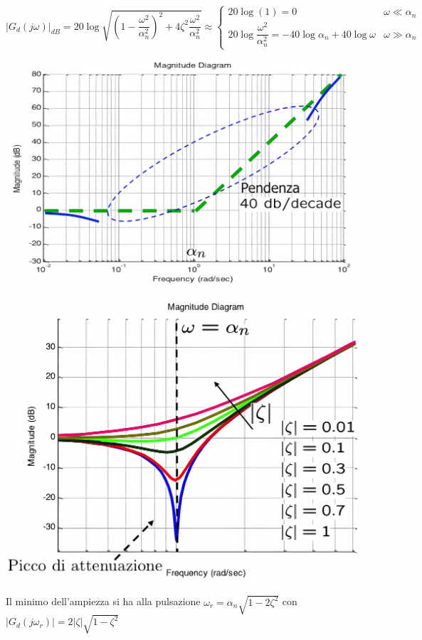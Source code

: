 \documentclass{article}
\numberwithin{equation}{subsection}
\begin{document}
\begin{equation*}
    |G_d(j\omega)|_{dB} = 20 \log \sqrt{\left(1 - \frac{\omega^2}{\alpha_n^2}\right)^2 + 4 \zeta^2 \frac{\omega^2}{\alpha_n^2}} \approx
    \begin{cases}
        20 \log(1) = 0 & \omega \ll \alpha_n\\
        20 \log \dfrac{\omega^2}{\alpha_n^2} = -40 \log \alpha_n + 40 \log \omega &\omega  \gg \alpha_n
    \end{cases}
\end{equation*}
\begin{center}
    \includegraphics[scale=0.125]{Images/Diagramma_zeri_cc_ampiezza_1.png}
\end{center}
\begin{center}
    \includegraphics[scale=0.125]{Images/Diagramma_zeri_cc_ampiezza_2.png}
\end{center}
Il minimo dell'ampiezza si ha alla pulsazione $\omega_r = \alpha_n \sqrt{1-2\zeta^2}$ con $|G_d(j\omega_r)| = 2 |\zeta|\sqrt{1-\zeta^2}$
\end{document}
